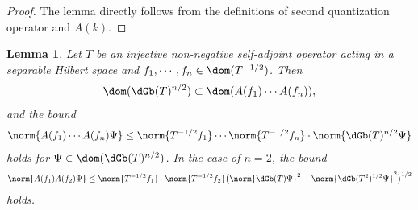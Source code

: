 \documentclass[12pt,draft]{article}
\theoremstyle{plain}
\newtheorem{lem}[theorem]{\bf Lemma}
\numberwithin{equation}{section}
\theoremstyle{remark}
\begin{document}
\begin{proof}
 The lemma directly follows from the definitions of second quantization operator and $A(k)$.
\end{proof}


\begin{lem}{\label{ak3}}
Let $T$ be an injective non-negative self-adjoint operator acting in a separable Hilbert space and $f_1,\cdots,f_n\in \dom(T^{-1/2})$.
Then
\begin{align*}
  \dom(\dGb(T)^{n/2})\subset \dom(A(f_1)\cdots A(f_n)),
\end{align*}
and the bound 
\begin{align}
  \norm{A(f_1)\cdots A(f_n)\Psi}
 \leq \norm{T^{-1/2}f_1}\cdots \norm{T^{-1/2}f_n} \cdot \norm{\dGb(T)^{n/2}\Psi} \label{ak3-1}
\end{align}
holds for $\Psi\in\dom(\dGb(T)^{n/2})$.
In the case of $n=2$, the bound
\begin{align}
  \norm{A(f_1) A(f_2)\Psi}
 \leq \norm{T^{-1/2}f_1}\cdot \norm{T^{-1/2}f_2}
  \big( \norm{\dGb(T)\Psi}^2 - \norm{\dGb(T^2)^{1/2}\Psi}^2 \big)^{1/2} \label{ak3-2}
\end{align}
holds.
\end{lem}
\end{document}
